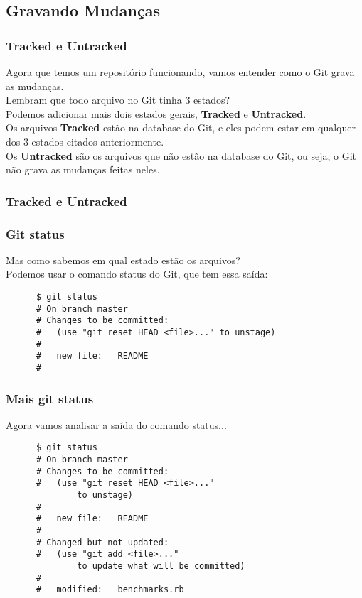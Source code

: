 \documentclass[brazil]{beamer}
\begin{document}
\subsection{Gravando Mudanças}

\begin{frame}[fragile]
  \frametitle{Tracked e Untracked}
  Agora que temos um repositório funcionando, vamos entender como o Git grava as mudanças. \\
  \pause
  Lembram que todo arquivo no Git tinha 3 estados? \\
  \pause
  Podemos adicionar mais dois estados gerais, \textbf{Tracked} e \textbf{Untracked}. \\
  \pause
  Os arquivos \textbf{Tracked} estão na database do Git, e eles podem estar em qualquer dos 3 estados citados
  anteriormente. \\
  \pause
  Os \textbf{Untracked} são os arquivos que não estão na database do Git, ou seja, o Git não grava as mudanças
  feitas neles.
\end{frame}

\begin{frame}[fragile]
  \frametitle{Tracked e Untracked}
\end{frame}

\begin{frame}[fragile]
  \frametitle{Git status}
  Mas como sabemos em qual estado estão os arquivos? \\
  \pause
  Podemos usar o comando status do Git, que tem essa saída:
  \begin{block}{}
    \begin{verbatim}
      $ git status
      # On branch master
      # Changes to be committed:
      #   (use "git reset HEAD <file>..." to unstage)
      #
      #   new file:   README
      #
    \end{verbatim}
  \end{block}
\end{frame}

\begin{frame}[fragile]
  \frametitle{Mais git status}
  Agora vamos analisar a saída do comando status...
  \begin{block}{}
    \begin{verbatim}
      $ git status
      # On branch master
      # Changes to be committed:
      #   (use "git reset HEAD <file>..." 
              to unstage)
      #
      #   new file:   README
      #
      # Changed but not updated:
      #   (use "git add <file>..." 
              to update what will be committed)
      #
      #   modified:   benchmarks.rb
    \end{verbatim}
  \end{block}
\end{frame}
\end{document}
